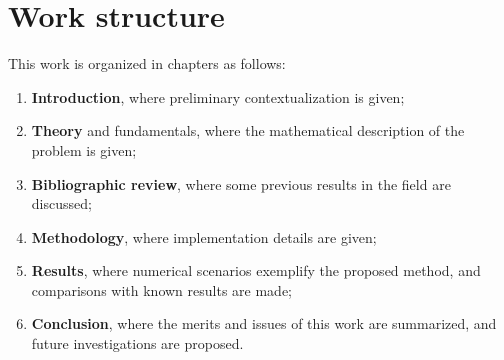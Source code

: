 



\section{Work structure}

This work is organized in chapters as follows:
\begin{enumerate}
    \item \textbf{Introduction}, where preliminary contextualization is given;
    \item \textbf{Theory} and fundamentals, where the mathematical description of the problem is given;
    \item \textbf{Bibliographic review}, where some previous results in the field are discussed;
    \item \textbf{Methodology}, where implementation details are given;
    \item \textbf{Results}, where numerical scenarios exemplify the proposed method, and comparisons with known results are made;
    \item \textbf{Conclusion}, where the merits and issues of this work are summarized, and future investigations are proposed.
\end{enumerate}